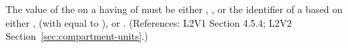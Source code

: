 The value of the   on a \Compartment having
 of  must be either ,
, or the identifier of a \UnitDefinition based on either
,  (with  equal to ), or
.  (References: L2V1 Section 4.5.4; L2V2
Section~\ref{sec:compartment-units}.)
